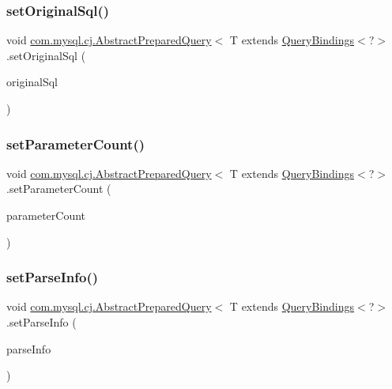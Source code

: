 \subsubsection{\texorpdfstring{set\+Original\+Sql()}{setOriginalSql()}}
{\footnotesize\ttfamily void \mbox{\hyperlink{classcom_1_1mysql_1_1cj_1_1_abstract_prepared_query}{com.\+mysql.\+cj.\+Abstract\+Prepared\+Query}}$<$ T extends \mbox{\hyperlink{interfacecom_1_1mysql_1_1cj_1_1_query_bindings}{Query\+Bindings}}$<$?$>$.set\+Original\+Sql (\begin{DoxyParamCaption}\item[{String}]{original\+Sql }\end{DoxyParamCaption})}

\mbox{\label{classcom_1_1mysql_1_1cj_1_1_abstract_prepared_query_ae445403998e9873663766a404997e7dc}} 
\subsubsection{\texorpdfstring{set\+Parameter\+Count()}{setParameterCount()}}
{\footnotesize\ttfamily void \mbox{\hyperlink{classcom_1_1mysql_1_1cj_1_1_abstract_prepared_query}{com.\+mysql.\+cj.\+Abstract\+Prepared\+Query}}$<$ T extends \mbox{\hyperlink{interfacecom_1_1mysql_1_1cj_1_1_query_bindings}{Query\+Bindings}}$<$?$>$.set\+Parameter\+Count (\begin{DoxyParamCaption}\item[{int}]{parameter\+Count }\end{DoxyParamCaption})}

\mbox{\label{classcom_1_1mysql_1_1cj_1_1_abstract_prepared_query_ab00c6b67848f2ba9272305a8ace05603}} 
\subsubsection{\texorpdfstring{set\+Parse\+Info()}{setParseInfo()}}
{\footnotesize\ttfamily void \mbox{\hyperlink{classcom_1_1mysql_1_1cj_1_1_abstract_prepared_query}{com.\+mysql.\+cj.\+Abstract\+Prepared\+Query}}$<$ T extends \mbox{\hyperlink{interfacecom_1_1mysql_1_1cj_1_1_query_bindings}{Query\+Bindings}}$<$?$>$.set\+Parse\+Info (\begin{DoxyParamCaption}\item[{\mbox{\hyperlink{classcom_1_1mysql_1_1cj_1_1_parse_info}{Parse\+Info}}}]{parse\+Info }\end{DoxyParamCaption})}

